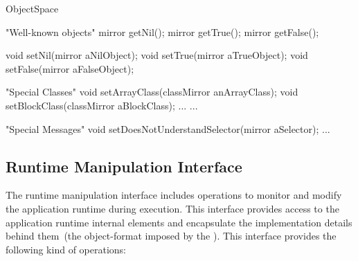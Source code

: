 \begin{code}
ObjectSpace {
    "Well-known objects"
    mirror getNil();
    mirror getTrue();
    mirror getFalse();

    void setNil(mirror aNilObject);
    void setTrue(mirror aTrueObject);
    void setFalse(mirror aFalseObject);
    
    "Special Classes"
    void setArrayClass(classMirror anArrayClass);
    void setBlockClass(classMirror aBlockClass);
    ...
    ...
    
    "Special Messages"
    void setDoesNotUnderstandSelector(mirror aSelector);
    ...
}
\end{code}



\subsection{Runtime Manipulation Interface} 
The runtime manipulation interface includes operations to monitor and modify the application runtime during execution. This interface provides access to the application runtime internal elements and encapsulate the implementation details behind them~(\ie the object-format imposed by the \VM). This interface provides the following kind of operations:

